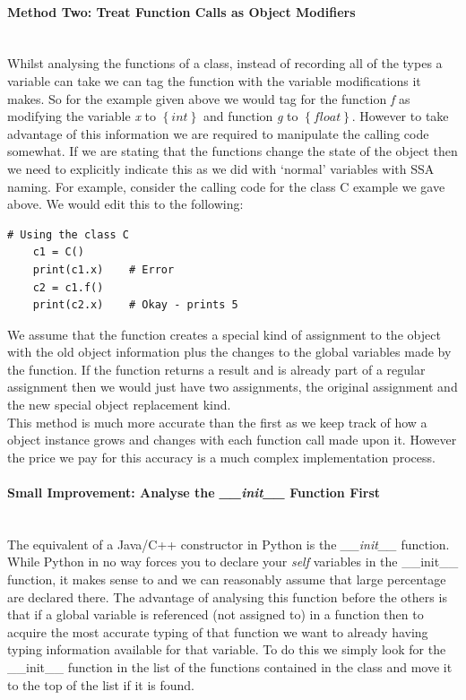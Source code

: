 \documentclass[12pt, titlepage]{article}
\begin{document}
\paragraph{Method Two: Treat Function Calls as Object Modifiers}\mbox{}\\
Whilst analysing the functions of a class, instead of recording all of the types a variable can take we can tag the function with the variable modifications it makes. So for the example given above we would tag for the function \textit{f} as modifying the variable \textit{x} to $\left\{ {int}\right\}$ and function \textit{g} to $\left\{ {float}\right\}$. However to take advantage of this information we are required to manipulate the calling code somewhat. If we are stating that the functions change the state of the object then we need to explicitly indicate this as we did with `normal' variables with SSA naming. For example, consider the calling code for the class C example we gave above. We would edit this to the following:
\begin{lstlisting}[mathescape]
	# Using the class C
	c1 = C()
	print(c1.x)    # Error
	c2 = c1.f()
	print(c2.x)    # Okay - prints 5
\end{lstlisting}
We assume that the function creates a special kind of assignment to the object with the old object information plus the changes to the global variables made by the function. If the function returns a result and is already part of a regular assignment then we would just have two assignments, the original assignment and the new special object replacement kind. \\
This method is much more accurate than the first as we keep track of how a object instance grows and changes with each function call made upon it. However the price we pay for this accuracy is a much complex implementation process.

\paragraph{Small Improvement: Analyse the \textit{\_\_init\_\_} Function First}\mbox{}\\
The equivalent of a Java/C++ constructor in Python is the \textit{\_\_init\_\_} function. While Python in no way forces you to declare your \textit{self} variables in the \_\_init\_\_ function, it makes sense to and we can reasonably assume that large percentage are declared there. The advantage of analysing this function before the others is that if a global variable is referenced (not assigned to) in a function then to acquire the most accurate typing of that function we want to already having typing information available for that variable. To do this we simply look for the \_\_init\_\_ function in the list of the functions contained in the class and move it to the top of the list if it is found.
\end{document}
